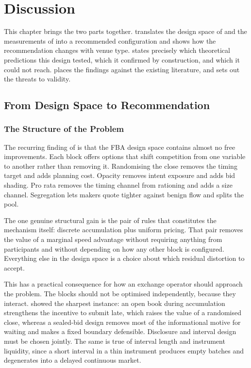 \chapter{Discussion}
\label{ch:discussion}

This chapter brings the two parts together. 
translates the design space of  and the measurements of
 into a recommended configuration and shows how the
recommendation changes with venue type.  states
precisely which theoretical predictions this design tested, which it
confirmed by construction, and which it could not reach.
 places the findings against the existing
literature, and  sets out the threats to validity.

\section{From Design Space to Recommendation}
\label{sec:synthesis}

\subsection{The Structure of the Problem}

The recurring finding of  is that the FBA design space
contains almost no free improvements. Each block offers options that
shift competition from one variable to another rather than removing it.
Randomising the close removes the timing target and adds planning cost.
Opacity removes intent exposure and adds bid shading. Pro rata removes
the timing channel from rationing and adds a size channel. Segregation
lets makers quote tighter against benign flow and splits the pool.

The one genuine structural gain is the pair of rules that constitutes
the mechanism itself: discrete accumulation plus uniform pricing. That
pair removes the value of a marginal speed advantage without requiring
anything from participants and without depending on how any other block
is configured. Everything else in the design space is a choice about
which residual distortion to accept.

This has a practical consequence for how an exchange operator should
approach the problem. The blocks should not be optimised independently,
because they interact.  showed the sharpest
instance: an open book during accumulation strengthens the incentive to
submit late, which raises the value of a randomised close, whereas a
sealed-bid design removes most of the informational motive for waiting
and makes a fixed boundary defensible. Disclosure and interval design
must be chosen jointly. The same is true of interval length and
instrument liquidity, since a short interval in a thin instrument
produces empty batches and degenerates into a delayed continuous
market.

